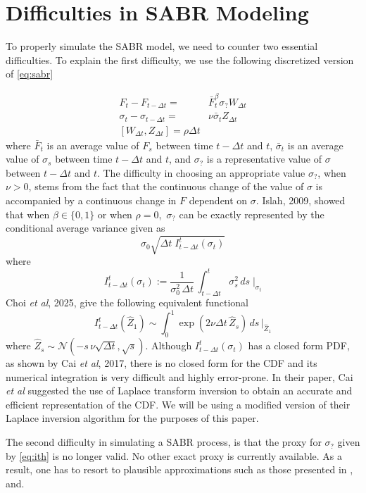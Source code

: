 \documentclass[12pt,oneside]{article}
\newcommand{\beqn}{\begin{equation}}
\newcommand{\eeqn}{\end{equation}}
\let\oin\in
\renewcommand{\in}{\!\oin\!}
\numberwithin{equation}{section}
\begin{document}
\section{Difficulties in SABR Modeling}
\label{sec:diff}
To properly simulate the SABR model, we need to counter two essential difficulties.
To explain the first difficulty, we use the following discretized version of \eqref{eq:sabr}

\beqn\label{eq:sabr_disc}
\begin{aligned}
    F_t - F_{t-\Delta t} = & \bar{F}_t^\beta \sigma_? W_{\Delta t}\\
    \sigma_t - \sigma_{t-\Delta t} =&\nu \bar{\sigma}_t Z_{\Delta t}\\
    [W_{\Delta t}, Z_{\Delta t}] = \rho \Delta t
\end{aligned}
\eeqn
where $\bar{F}_t$ is an average value of $F_s$ between time $t-\Delta t$ and $t$,
$\bar{\sigma}_t$ is an average value of $\sigma_s$ between time $t-\Delta t$ and $t$,
and $\sigma_?$ is a representative value of $\sigma$ between $t-\Delta t$ and $t$.
The difficulty in choosing an appropriate value $\sigma_?$, when $\nu>0$,
stems from the fact
that the continuous change of the value of $\sigma$ is accompanied by
a continuous change in $F$ dependent on $\sigma$.
Islah, 2009\cite{I}, showed that when $\beta \in \{0,1\}$ or when $\rho=0$,\,
$\sigma_?$ can be exactly represented by the conditional average variance given as
\beqn\label{eq:ith}
\sigma_0\sqrt{\Delta t\;I_{t-\Delta t}^t(\sigma_t)}
\eeqn
where
\beqn
I_{t-\Delta t}^t(\sigma_t):=\frac{1}{\sigma_0^2\, \Delta t}\,
\int_{t-\Delta t}^t \sigma_s^2\, ds \;\bigg|_{\sigma_t}
\eeqn
Choi {\em et al}, 2025\cite{CHK}, give the following equivalent functional
\beqn
I_{t-\Delta t}^t(\hat{Z}_1)\sim \int_0^1 \exp(2\nu\Delta t\, \hat{Z}_s)\,ds\,\big|_{\hat{Z}_1}
\eeqn
where $\hat{Z}_s\sim \mathcal{N}\left(-s\,\nu\sqrt{\Delta t}, \sqrt{s}\right)$.
Although $I_{t-\Delta t}^t(\sigma_t)$ has a closed form PDF, as shown by
Cai {\em et al}, 2017\cite{CSC}, there is no closed form for the CDF and
its numerical integration is very difficult and highly error-prone.
In their paper, Cai {\em et al} suggested the use of Laplace transform inversion
to obtain an accurate and efficient representation of the CDF.
We will be using a modified version of their Laplace inversion algorithm for the
purposes of this paper.

The second difficulty in simulating a SABR process,
is that the proxy for $\sigma_?$ given by \eqref{eq:ith}
is no longer valid.
No other exact proxy is currently available.
As a result, one has to resort to plausible approximations such as those presented in
\cite{CSC},\cite{CHK} and\cite{HKLW}.
\end{document}
